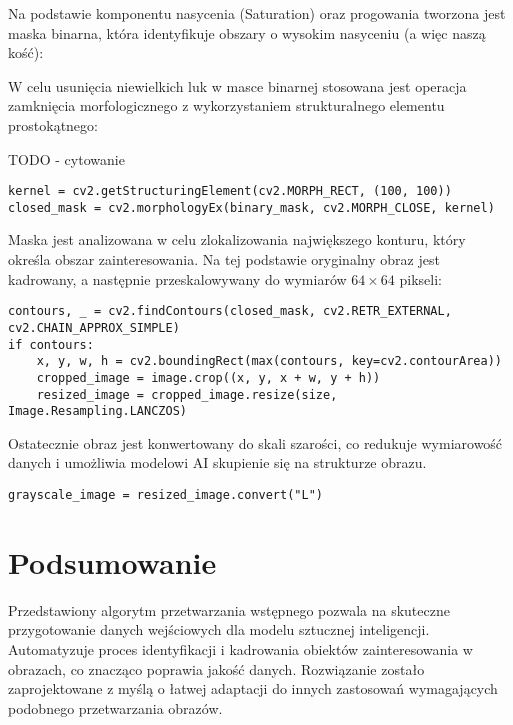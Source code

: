 Na podstawie komponentu nasycenia (Saturation) oraz progowania tworzona jest maska binarna, która identyfikuje obszary o wysokim nasyceniu (a więc naszą kość):

W celu usunięcia niewielkich luk w masce binarnej stosowana jest operacja zamknięcia morfologicznego z wykorzystaniem strukturalnego elementu prostokątnego:


TODO - cytowanie

\begin{verbatim}
kernel = cv2.getStructuringElement(cv2.MORPH_RECT, (100, 100))
closed_mask = cv2.morphologyEx(binary_mask, cv2.MORPH_CLOSE, kernel)
\end{verbatim}

Maska jest analizowana w celu zlokalizowania największego konturu, który określa obszar zainteresowania. Na tej podstawie oryginalny obraz jest kadrowany, a następnie przeskalowywany do wymiarów $64 \times 64$ pikseli:

\begin{verbatim}
contours, _ = cv2.findContours(closed_mask, cv2.RETR_EXTERNAL, cv2.CHAIN_APPROX_SIMPLE)
if contours:
    x, y, w, h = cv2.boundingRect(max(contours, key=cv2.contourArea))
    cropped_image = image.crop((x, y, x + w, y + h))
    resized_image = cropped_image.resize(size, Image.Resampling.LANCZOS)
\end{verbatim}

Ostatecznie obraz jest konwertowany do skali szarości, co redukuje wymiarowość danych i umożliwia modelowi AI skupienie się na strukturze obrazu.

\begin{verbatim}
grayscale_image = resized_image.convert("L")
\end{verbatim}

\section{Podsumowanie}

Przedstawiony algorytm przetwarzania wstępnego pozwala na skuteczne przygotowanie danych wejściowych dla modelu sztucznej inteligencji.
Automatyzuje proces identyfikacji i kadrowania obiektów zainteresowania w obrazach, co znacząco poprawia jakość danych.
Rozwiązanie zostało zaprojektowane z myślą o łatwej adaptacji do innych zastosowań wymagających podobnego przetwarzania obrazów.


